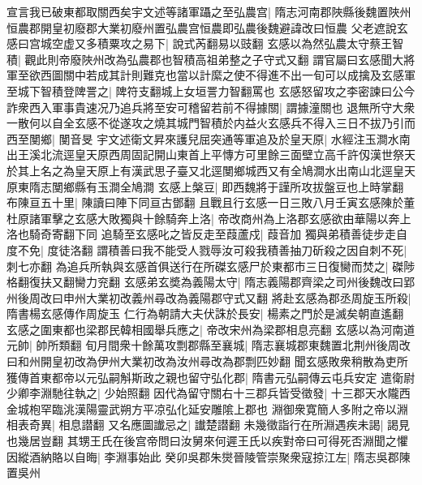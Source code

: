 宣言我已破東都取關西矣宇文述等諸軍躡之至弘農宫|{
	隋志河南郡陜縣後魏置陜州恒農郡開皇初廢郡大業初廢州置弘農宫恒農即弘農後魏避諱改曰恒農}
父老遮說玄感曰宫城空虚又多積粟攻之易下|{
	說式芮翻易以豉翻}
玄感以為然弘農太守蔡王智積|{
	觀此則帝廢陜州改為弘農郡也智積高祖弟整之子守式又翻}
謂官屬曰玄感聞大將軍至欲西圖關中若成其計則難克也當以計縻之使不得進不出一旬可以成擒及玄感軍至城下智積登陴詈之|{
	陴符支翻城上女垣詈力智翻罵也}
玄感怒留攻之李密諫曰公今詐衆西入軍事貴速况乃追兵將至安可稽留若前不得據關|{
	謂據潼關也}
退無所守大衆一散何以自全玄感不從遂攻之燒其城門智積於内益火玄感兵不得入三日不拔乃引而西至閺鄉|{
	閺音旻}
宇文述衛文昇來護兒屈突通等軍追及於皇天原|{
	水經注玉澗水南出王溪北流逕皇天原西周固記開山東首上平慱方可里餘三面壁立高千許仭漢世祭天於其上名之為皇天原上有漢武思子臺又北逕閺鄉城西又有全鳩澗水出南山北逕皇天原東隋志閺鄉縣有玉澗全鳩澗}
玄感上槃豆|{
	即西魏將于謹所攻拔盤豆也上時掌翻}
布陳亘五十里|{
	陳讀曰陣下同亘古鄧翻}
且戰且行玄感一日三敗八月壬寅玄感陳於董杜原諸軍擊之玄感大敗獨與十餘騎奔上洛|{
	帝改商州為上洛郡玄感欲由華陽以奔上洛也騎奇寄翻下同}
追騎至玄感叱之皆反走至葭蘆戍|{
	葭音加}
獨與弟積善徒步走自度不免|{
	度徒洛翻}
謂積善曰我不能受人戮辱汝可殺我積善抽刀斫殺之因自刺不死|{
	刺七亦翻}
為追兵所執與玄感首俱送行在所磔玄感尸於東都市三日復臠而焚之|{
	磔陟格翻復扶又翻臠力兖翻}
玄感弟玄奬為義陽太守|{
	隋志義陽郡齊梁之司州後魏改曰郢州後周改曰申州大業初改義州尋改為義陽郡守式又翻}
將赴玄感為郡丞周旋玉所殺|{
	隋書楊玄感傳作周旋玉}
仁行為朝請大夫伏誅於長安|{
	楊素之門於是滅矣朝直遙翻}
玄感之圍東都也梁郡民韓相國舉兵應之|{
	帝改宋州為梁郡相息亮翻}
玄感以為河南道元帥|{
	帥所類翻}
旬月間衆十餘萬攻剽郡縣至襄城|{
	隋志襄城郡東魏置北荆州後周改曰和州開皇初改為伊州大業初改為汝州尋改為郡剽匹妙翻}
聞玄感敗衆稍散為吏所獲傳首東都帝以元弘嗣斛斯政之親也留守弘化郡|{
	隋書元弘嗣傳云屯兵安定}
遣衛尉少卿李淵馳往執之|{
	少始照翻}
因代為留守關右十三郡兵皆受徵發|{
	十三郡天水隴西金城枹罕臨洮漢陽靈武朔方平凉弘化延安雕隂上郡也}
淵御衆寛簡人多附之帝以淵相表奇異|{
	相息譛翻}
又名應圖䜟忌之|{
	䜟楚譛翻}
未幾徵詣行在所淵遇疾未謁|{
	謁見也幾居豈翻}
其甥王氏在後宫帝問曰汝舅來何遲王氏以疾對帝曰可得死否淵聞之懼因縱酒納賂以自晦|{
	李淵事始此}
癸卯吳郡朱爕晉陵管崇聚衆寇掠江左|{
	隋志吳郡陳置吳州}


